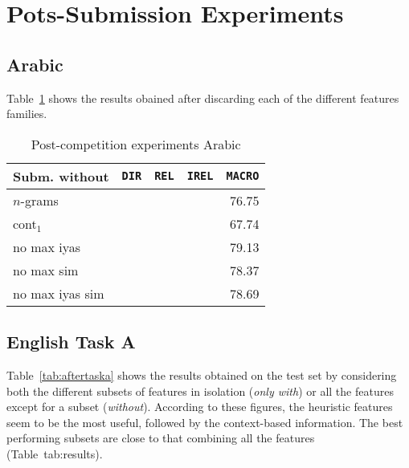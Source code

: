 \section{Pots-Submission Experiments}
\label{sec:discussion}


\subsection{Arabic} \label{sec:discussionArabic}

Table~\ref{tab:aftertaskarabic} shows the results obained after discarding each 
of the different features families.

\begin{table}%
\begin{tabular}{|l|crrr|}
\hline  
 Subm. without& \bf \texttt{DIR} & \bf \texttt{REL} & \bf \texttt{IREL} & 
\bf \texttt{MACRO} \\\hline
 $n$-grams	&	&	&	& 76.75	\\
 cont$_1$	&	&	&	& 67.74	\\
 no max iyas	&	&	&	& 79.13	\\
 no max sim	&	&	&	& 78.37	\\
 no max iyas sim&	&	&	& 78.69	\\ 
  \hline
 \end{tabular}
 \caption{Post-competition experiments Arabic\label{tab:aftertaskarabic}}
 \end{table}

\subsection{English Task A} \label{sec:discussiona}

Table~\ref{tab:aftertaska} shows the results obtained on the test set by 
considering both the different subsets of features in isolation (\textit{only 
with}) or all the features except for a subset (\textit{without}). According to 
these figures, the heuristic features seem to be the most useful, followed by 
the context-based information. The best performing subsets are close to that 
combining all the features (\cf Table~{tab:results}).


